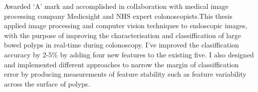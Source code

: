 Awarded `A' mark and accomplished in collaboration with medical image processing company Medicsight and NHS expert colonoscopists.This thesis applied image processing and computer vision techniques to endoscopic images, with the purpose of improving the characterisation and classiffication of large bowel polyps in real-time during colonoscopy.
I've improved the clasiffication accuracy by 2-5\% by adding four new features to the existing five.
I also designed and implemented different approaches to narrow the margin of classiffication error by producing measurements of feature stability such as feature variability across the surface of polyps.
